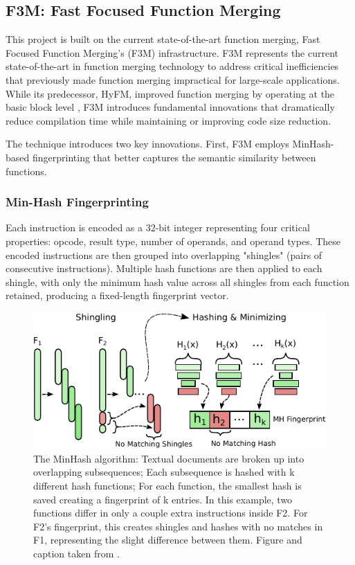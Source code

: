 \subsection{F3M: Fast Focused Function Merging}
This project is built on the current state-of-the-art function merging, Fast Focused Function Merging's (F3M) infrastructure. F3M represents the current state-of-the-art in function merging technology to address critical inefficiencies that previously made function merging impractical for large-scale applications. While its predecessor, HyFM, improved function merging by operating at the basic block level \cite{HyFM:FunctionMergingForFree}, F3M introduces fundamental innovations that dramatically reduce compilation time while maintaining or improving code size reduction.

The technique introduces two key innovations. First, F3M employs MinHash-based fingerprinting that better captures the semantic similarity between functions. 

\subsubsection{Min-Hash Fingerprinting} \label{METRIC: MinHashFingerprint}
Each instruction is encoded as a 32-bit integer representing four critical properties: opcode, result type, number of operands, and operand types. These encoded instructions are then grouped into overlapping "shingles" (pairs of consecutive instructions).  Multiple hash functions are then applied to each shingle, with only the minimum hash value across all shingles from each function retained, producing a fixed-length fingerprint vector.

\begin{figure}[h!]
\centering
\includegraphics[scale=1]{Figures/F3M_MinHash.pdf}
\caption{The MinHash algorithm: Textual documents are broken up into overlapping subsequences; Each subsequence is hashed with k different hash functions; For each function, the smallest hash is saved creating a fingerprint of k entries. In this example, two functions differ in only a couple extra instructions inside F2. For F2’s fingerprint, this creates shingles and hashes with no matches in F1, representing the slight difference between them. Figure and caption taken from  \cite{F3M:FastFocusedFunctionMerging}.}\label{fig:testsvg}
\end{figure}

